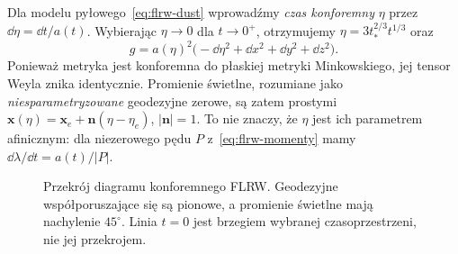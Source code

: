 \begin{przyklad}
\label{prz:flrw-konforemny}
Dla modelu pyłowego~\eqref{eq:flrw-dust} wprowadźmy
\emph{czas konforemny} $\eta$ przez $\dd\eta=\dd t/a(t)$.
Wybierając $\eta\to0$ dla $t\to0^+$, otrzymujemy
$\eta=3t_*^{2/3}t^{1/3}$ oraz
\begin{equation}\label{eq:flrw-konforemna}
 g=a(\eta)^2\bigl(-\dd\eta^2+\dd x^2+\dd y^2+\dd z^2\bigr).
\end{equation}
Ponieważ metryka jest konforemna do płaskiej metryki
Minkowskiego, jej tensor Weyla znika identycznie.
Promienie świetlne, rozumiane jako \emph{niesparametryzowane}
geodezyjne zerowe, są zatem prostymi
$\mathbf x(\eta)=\mathbf x_e+\mathbf n(\eta-\eta_e)$,
$|\mathbf n|=1$. To nie znaczy, że $\eta$ jest ich
parametrem afinicznym: dla niezerowego pędu $P$
z~\eqref{eq:flrw-momenty} mamy
$\dd\lambda/\dd t=a(t)/|P|$.

\begin{figure}[htbp]
\centering
{}
\caption{Przekrój diagramu konforemnego FLRW.
Geodezyjne współporuszające się są pionowe, a promienie świetlne
mają nachylenie $45^\circ$. Linia $t=0$ jest brzegiem
wybranej czasoprzestrzeni, nie jej przekrojem.}
\label{fig:flrw-konforemny}
\end{figure}
\end{przyklad}

